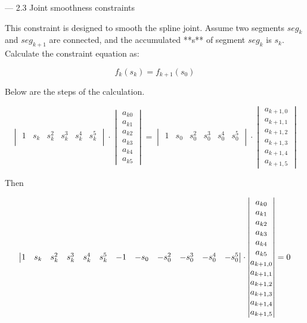 \documentclass[a4paper,11pt]{article}  %
\begin{document}
--- 2.3  Joint smoothness  constraints

This constraint is designed to smooth the spline joint.  Assume two segments $seg_k$ and $seg_{k+1}$ are connected, and the accumulated **s** of segment $seg_k$ is $s_k$. Calculate the constraint equation as: 

$$
f_k(s_k) = f_{k+1} (s_0)
$$

Below are the steps of the calculation.

$$
\begin{vmatrix} 
 1 & s_k & s_k^2 & s_k^3 & s_k^4&s_k^5 \\
 \end{vmatrix} 
 \cdot 
 \begin{vmatrix} 
 a_{k0} \\ a_{k1} \\ a_{k2} \\ a_{k3} \\ a_{k4} \\ a_{k5} 
 \end{vmatrix} 
 = 
\begin{vmatrix} 
 1 & s_{0} & s_{0}^2 & s_{0}^3 & s_{0}^4&s_{0}^5 \\
 \end{vmatrix} 
 \cdot 
 \begin{vmatrix} 
 a_{k+1,0} \\ a_{k+1,1} \\ a_{k+1,2} \\ a_{k+1,3} \\ a_{k+1,4} \\ a_{k+1,5} 
 \end{vmatrix}
$$

Then

$$
\addtocounter{MaxMatrixCols}{10}
\begin{vmatrix} 

 1 & s_k & s_k^2 & s_k^3 & s_k^4&s_k^5 &  -1 & -s_{0} & -s_{0}^2 & -s_{0}^3 & -s_{0}^4&-s_{0}^5\\
 \end{vmatrix} 
 \cdot 
 \begin{vmatrix} 
 a_{k0} \\ a_{k1} \\ a_{k2} \\ a_{k3} \\ a_{k4} \\ a_{k5} \\ a_{k+1,0} \\ a_{k+1,1} \\ a_{k+1,2} \\ a_{k+1,3} \\ a_{k+1,4} \\ a_{k+1,5}  
 \end{vmatrix} 
 = 0
$$
\end{document}
